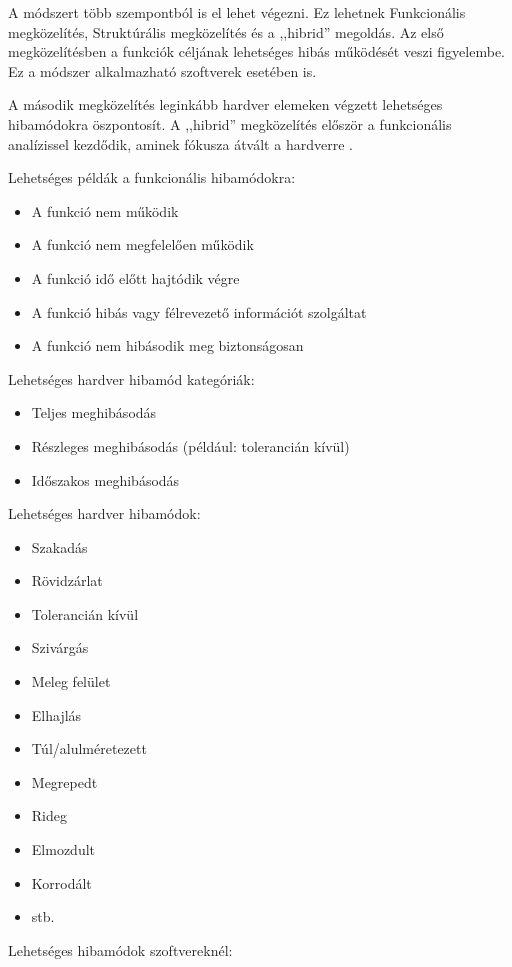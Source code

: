 A módszert több szempontból is el lehet végezni.
Ez lehetnek Funkcionális megközelítés, Struktúrális megközelítés és a ,,hibrid'' megoldás.
Az első megközelítésben a funkciók céljának lehetséges hibás működését veszi figyelembe.
Ez a módszer alkalmazható szoftverek esetében is.

A második megközelítés leginkább hardver elemeken végzett lehetséges hibamódokra öszpontosít.
A ,,hibrid'' megközelítés először a funkcionális analízissel kezdődik, aminek fókusza átvált a hardverre \cite{Ericson}.

Lehetséges példák a funkcionális hibamódokra:
\begin{itemize}
    \item A funkció nem működik
    \item A funkció nem megfelelően működik
    \item A funkció idő előtt hajtódik végre
    \item A funkció hibás vagy félrevezető információt szolgáltat
    \item A funkció nem hibásodik meg biztonságosan
\end{itemize}
Lehetséges hardver hibamód kategóriák:
\begin{itemize}
    \item Teljes meghibásodás
    \item Részleges meghibásodás (például: tolerancián kívül)
    \item Időszakos meghibásodás
\end{itemize}
Lehetséges hardver hibamódok:
\begin{itemize}
    \item Szakadás
    \item Rövidzárlat
    \item Tolerancián kívül
    \item Szivárgás
    \item Meleg felület
    \item Elhajlás
    \item Túl/alulméretezett
    \item Megrepedt
    \item Rideg
    \item Elmozdult
    \item Korrodált
    \item stb.
\end{itemize}
Lehetséges hibamódok szoftvereknél:
